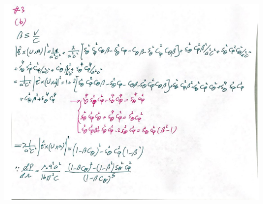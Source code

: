 \documentclass[fleqn]{article}
\begin{document}
\begin{enumerate}
    \begin{center}
      \includegraphics[height=16cm, width=17cm]{3B(A).JPG}
    \end{center}

    \pagebreak


\end{enumerate}
\end{document}
